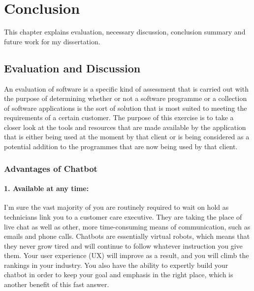 \def\baselinestretch{1}

\chapter{Conclusion}
This chapter explains evaluation, necessary discussion, conclusion summary and future work for my dissertation.

\def\baselinestretch{1.66}

 

\goodbreak
\section{Evaluation and Discussion}
An evaluation of software is a specific kind of assessment that is carried out with the purpose of determining whether or not a software programme or a collection of software applications is the sort of solution that is most suited to meeting the requirements of a certain customer. The purpose of this exercise is to take a closer look at the tools and resources that are made available by the application that is either being used at the moment by that client or is being considered as a potential addition to the programmes that are now being used by that client.

\subsection{Advantages of Chatbot}

\subsubsection{1. Available at any time:}
I'm sure the vast majority of you are routinely required to wait on hold as technicians link you to a customer care executive. They are taking the place of live chat as well as other, more time-consuming means of communication, such as emails and phone calls. Chatbots are essentially virtual robots, which means that they never grow tired and will continue to follow whatever instruction you give them. Your user experience (UX) will improve as a result, and you will climb the rankings in your industry. You also have the ability to expertly build your chatbot in order to keep your goal and emphasis in the right place, which is another benefit of this fast answer.

